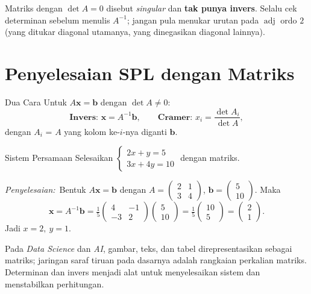 \documentclass[11pt,a4paper]{report}
\theoremstyle{gaya}
\newcommand{\jawab}{\par\smallskip\noindent\textit{\textcolor{oranye}{Penyelesaian:}}\ }
\begin{document}
\begin{kesalahan}
Matriks dengan $\det A=0$ disebut \emph{singular} dan \textbf{tak punya invers}. Selalu cek determinan sebelum menulis $A^{-1}$; jangan pula menukar urutan pada $\operatorname{adj}$ ordo $2$ (yang ditukar diagonal utamanya, yang dinegasikan diagonal lainnya).
\end{kesalahan}

\section{Penyelesaian SPL dengan Matriks}
\begin{konsep}{Dua Cara}
Untuk $A\mathbf x=\mathbf b$ dengan $\det A\neq0$:
\[
\textbf{Invers: } \mathbf x=A^{-1}\mathbf b, \qquad
\textbf{Cramer: } x_i=\frac{\det A_i}{\det A},
\]
dengan $A_i$ = $A$ yang kolom ke-$i$-nya diganti $\mathbf b$.
\end{konsep}

\begin{contoh}{Sistem Persamaan}
Selesaikan $\begin{cases} 2x + y = 5\\ 3x + 4y = 10 \end{cases}$ dengan matriks.

\jawab Bentuk $A\mathbf{x}=\mathbf{b}$ dengan $A=\begin{pmatrix}2&1\\3&4\end{pmatrix}$,
$\mathbf{b}=\begin{pmatrix}5\\10\end{pmatrix}$. Maka
\[
\mathbf{x}=A^{-1}\mathbf{b}=\tfrac15\begin{pmatrix}4&-1\\-3&2\end{pmatrix}\begin{pmatrix}5\\10\end{pmatrix}
=\tfrac15\begin{pmatrix}10\\5\end{pmatrix}=\begin{pmatrix}2\\1\end{pmatrix}.
\]
Jadi $x=2,\ y=1$.
\end{contoh}

\begin{dunianyata}
Pada \emph{Data Science} dan \emph{AI}, gambar, teks, dan tabel direpresentasikan sebagai matriks; jaringan saraf tiruan pada dasarnya adalah rangkaian perkalian matriks. Determinan dan invers menjadi alat untuk menyelesaikan sistem dan menstabilkan perhitungan.
\end{dunianyata}
\end{document}
